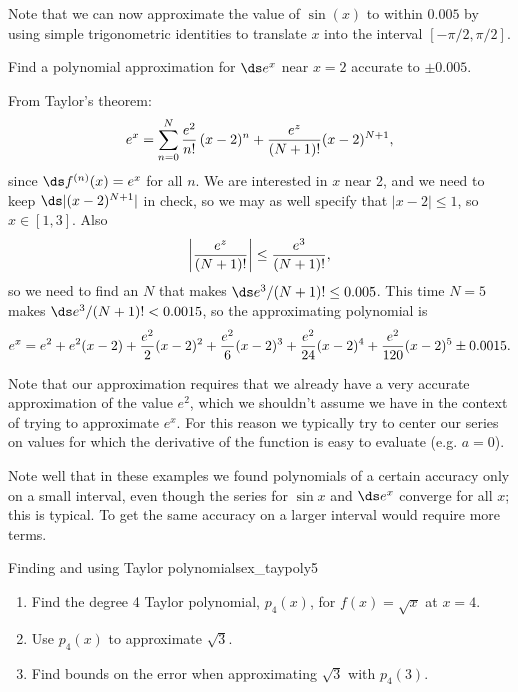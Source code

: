 Note that we can now approximate the value of $\sin(x)$ to within $ 0.005 $ by
using simple trigonometric identities to translate $x$ into the interval $[-\pi/2,\pi/2]$.

\begin{example}{}{}
Find a polynomial approximation for $\ds e^x$ near $x=2$
accurate to $\pm 0.005$. 
\end{example}
\begin{solution}
From Taylor's theorem:
$$
  e^x= \sum_{n=0}^N{e^2\over n!}\,(x-2)^n + 
  {e^z\over (N+1)!}(x-2)^{N+1},
$$
since $\ds f^{(n)}(x)=e^x$ for all $n$. We are interested in $x$ near 2,
and we need to keep $\ds |(x-2)^{N+1}|$ in check, so we may as well
specify that $|x-2|\le 1$, so $x\in[1,3]$. Also
$$\left|{e^z\over (N+1)!}\right|\le {e^3\over (N+1)!},$$
so we need to find an $N$ that makes $\ds e^3/(N+1)!\le 0.005$. This time
$N=5$ makes $\ds e^3/(N+1)!< 0.0015$, so the approximating polynomial is
$$
  e^x=e^2+e^2(x-2)+{e^2\over2}(x-2)^2+{e^2\over6}(x-2)^3+
  {e^2\over24}(x-2)^4+{e^2\over120}(x-2)^5
  \pm 0.0015.
$$

Note that our approximation requires that we already have a very
accurate approximation of the value $e^2$, which we shouldn't assume
we have in the context of trying to approximate $e^x$. For this reason
we typically try to center our series on values for which the derivative
of the function is easy to evaluate (e.g. $a=0$).
\end{solution}

Note well that in these examples we found polynomials of a certain
accuracy only on a small interval, even though the series for $\sin x$
and $\ds e^x$ converge for all $x$; this is typical. To get the same
accuracy on a larger interval would require more terms. 


%

\begin{example}{Finding and using Taylor polynomials}{ex_taypoly5}{
\begin{enumerate}
					\item		Find the degree 4 Taylor polynomial, $p_4(x)$, for $f(x)=\sqrt{x}$ at $x=4.$
					\item		Use $p_4(x)$ to approximate $\sqrt{3}$.
					\item		Find bounds on the error when approximating $\sqrt{3}$ with $p_4(3)$.
					\end{enumerate}
}
\end{example}


